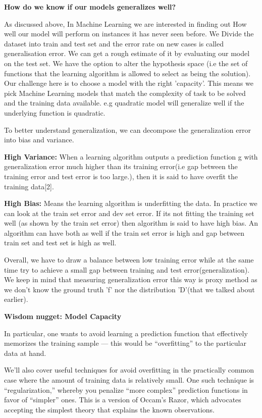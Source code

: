 \documentclass[openany]{book}
\begin{document}
\textbf{How do we know if our models generalizes well?}

As discussed above, In Machine Learning we are interested in finding out How well our model will perform on instances it has never seen before. We Divide the dataset into train and test set and the error rate on new cases is called generalisation error. We can get a rough estimate of it by evaluating our model on the test set. We have the option to alter the hypothesis space (i.e the set of functions that the learning algorithm is allowed to select as being the solution). Our challenge here is to choose a model with the right 'capacity'. This means we pick Machine Learning models that match the complexity of task to be solved and the training data available. e.g quadratic model will generalize well if the underlying function is quadratic.

To better understand generalization, we can decompose the generalization error into bias and variance.

\textbf{High Variance:} When a learning algorithm outputs a prediction function g with generalization error much higher than its training error(i.e gap between the training error and test error is too large.), then it is said to have overfit the training data[2].

\textbf{High Bias:}  Means the learning algorithm is underfitting the data. In practice we can look at the train set error and dev set error. If its not fitting the training set well (as shown by the train set error) then algorithm is said to have high bias. An algorithm can have both as well if the train set error is high and gap between train set and test set is high as well.

Overall, we have to draw a balance between low training error while at the same time try to achieve a small gap between training and test error(generalization). We keep in mind that measuring generalization error this way is proxy method as we don't know the ground truth 'f' nor the distribution 'D'(that we talked about earlier).


\textbf{Wisdom nugget: Model Capacity}

In particular, one wants to avoid learning a prediction function that effectively memorizes the training sample — this would be “overfitting” to the particular data at hand. 

We’ll also cover useful techniques for avoid overfitting in the practically common case where the amount of training data is relatively small. One such technique is “regularization,” whereby you penalize “more complex” prediction functions in favor of “simpler” ones. This is a version of Occam’s Razor, which advocates accepting the simplest theory that explains the known observations.
\end{document}
